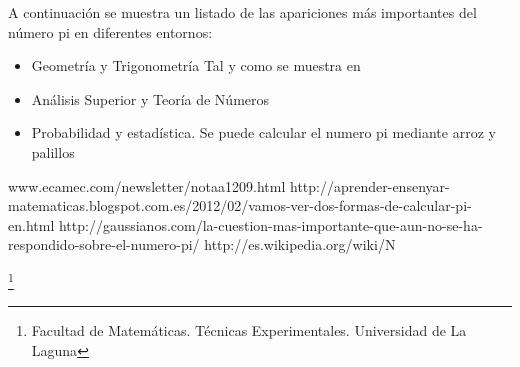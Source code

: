 \documentclass[spanish,11pt,a4paper]{article}
\begin{document}
A continuación se muestra un listado de las apariciones más importantes del número pi en diferentes entornos:

\begin{itemize}

\item Geometría y Trigonometría
Tal y como se muestra en 
\item Análisis Superior y Teoría de Números
\item Probabilidad y estadística.
Se puede calcular el numero pi mediante arroz y palillos \cite{Arroz}

\end{itemize}



\begin{thebibliography}{11}
 www.ecamec.com/newsletter/notaa1209.html
 http://aprender-ensenyar-matematicas.blogspot.com.es/2012/02/vamos-ver-dos-formas-de-calcular-pi-en.html
 http://gaussianos.com/la-cuestion-mas-importante-que-aun-no-se-ha-respondido-sobre-el-numero-pi/
 http://es.wikipedia.org/wiki/N%
\end{thebibliography}

\footnote{Facultad de Matemáticas. Técnicas Experimentales. Universidad de La Laguna}
\end{document}
